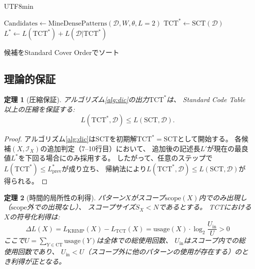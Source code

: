 \documentclass[11pt,a4paper]{article}
\newtheorem{theorem}{定理}
\begin{document}
\begin{CJK}{UTF8}{min}
\begin{algorithm}[t]
$\text{Candidates} \leftarrow \text{MineDensePatterns}(\mathcal{D}, W, \theta, L{=}2)$\;
$\text{TCT}^* \leftarrow \text{SCT}(\mathcal{D})$ 
$L^* \leftarrow L(\text{TCT}^*) + L(\mathcal{D}|\text{TCT}^*)$\;

候補をStandard Cover Orderでソート\;

\;
\caption{Dense Interval Compression（DIC）}
\label{alg:dic}
\end{algorithm}

\subsection{理論的保証}

\begin{theorem}[圧縮保証]\label{thm:compression}
アルゴリズム\ref{alg:dic}の出力$\text{TCT}^*$は、
Standard Code Table以上の圧縮を保証する:
\begin{equation}
  L(\text{TCT}^*, \mathcal{D}) \leq L(\text{SCT}, \mathcal{D}).
\end{equation}
\end{theorem}

\begin{proof}
アルゴリズム\ref{alg:dic}はSCTを初期解$\text{TCT}^* = \text{SCT}$として開始する。
各候補$(X, \mathcal{I}_X)$の追加判定（7--10行目）において、
追加後の記述長$L'$が現在の最良値$L^*$を下回る場合にのみ採用する。
したがって、任意のステップで$L(\text{TCT}^*) \leq L^*_{\text{prev}}$が成り立ち、
帰納法により$L(\text{TCT}^*, \mathcal{D}) \leq L(\text{SCT}, \mathcal{D})$が得られる。
\end{proof}

\begin{theorem}[時間的局所性の利得]\label{thm:locality}
パターン$X$がスコープ$\text{scope}(X)$内でのみ出現し（$\text{scope}$外での出現なし）、
スコープサイズ$S_X < N$であるとする。
TCTにおける$X$の符号化利得は:
\begin{equation}\label{eq:locality_gain}
  \Delta L(X) = L_{\text{KRIMP}}(X) - L_{\text{TCT}}(X)
  = \text{usage}(X) \cdot \log_2 \frac{U_{\text{in}}}{U}
  > 0
\end{equation}
ここで$U = \sum_{Y \in \text{CT}} \text{usage}(Y)$は全体での総使用回数、
$U_{\text{in}}$はスコープ内での総使用回数であり、
$U_{\text{in}} < U$（スコープ外に他のパターンの使用が存在する）のとき利得が正となる。
\end{theorem}


\end{CJK}
\end{document}
